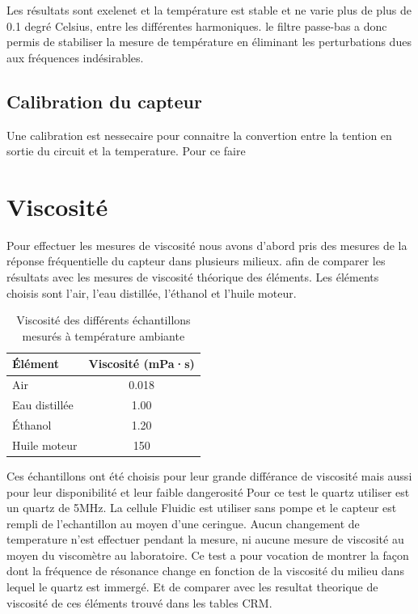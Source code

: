 Les résultats sont exelenet et la température est stable et ne varie plus de plus de 0.1 degré Celsius, entre les différentes harmoniques.
le filtre passe-bas a donc permis de stabiliser la mesure de température en éliminant les perturbations dues aux fréquences indésirables.

\subsection{Calibration du capteur}
Une calibration est nessecaire pour connaitre la convertion entre la tention en sortie du circuit et la temperature.
Pour ce faire 

\section{Viscosité}
Pour effectuer les mesures de viscosité nous avons d'abord pris des mesures de la réponse fréquentielle du capteur dans plusieurs milieux.
afin de comparer les résultats avec les mesures de viscosité théorique des éléments. Les éléments choisis sont l'air, l'eau distillée, l'éthanol et l'huile moteur.
\begin{table}[H]
    \centering
    \begin{tabular}{|l|c|}
        \hline
        \textbf{Élément}      & \textbf{Viscosité (mPa·s)} \\
        \hline
        Air                  & 0.018 \\
        Eau distillée        & 1.00  \\
        Éthanol              & 1.20  \\
        Huile moteur         & 150   \\
        \hline
    \end{tabular}
    \caption{Viscosité des différents échantillons mesurés à température ambiante}
    \label{tab:viscosite_elements}
\end{table}
Ces échantillons ont été choisis pour leur grande différance de viscosité mais aussi pour leur disponibilité et leur faible dangerosité
Pour ce test le quartz utiliser est un quartz de 5MHz. La cellule Fluidic est utiliser sans pompe et le capteur est rempli de l'echantillon au moyen d'une ceringue. 
Aucun changement de temperature n'est effectuer pendant la mesure, ni aucune mesure de viscosité au moyen du viscomètre au laboratoire.
Ce test a pour vocation de montrer la façon dont la fréquence de résonance change en fonction de la viscosité du milieu dans lequel le quartz est immergé. Et de comparer avec les resultat theorique de viscosité de ces éléments trouvé dans les tables CRM\cite{crm_viscosity_table}.

